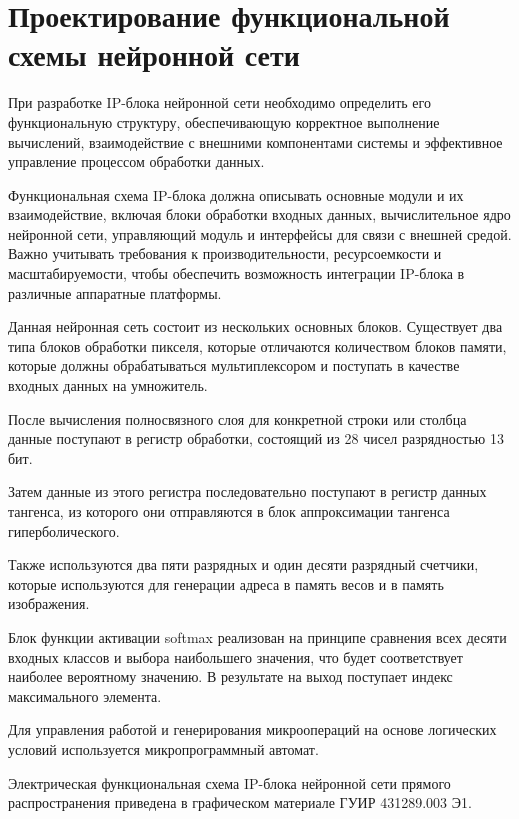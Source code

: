 \section{Проектирование функциональной схемы нейронной сети}
\hspace*{12.5 mm}При разработке IP-блока нейронной сети необходимо определить 
его функциональную структуру, обеспечивающую корректное выполнение вычислений, 
взаимодействие с внешними компонентами системы и эффективное управление 
процессом обработки данных.

Функциональная схема IP-блока должна описывать основные модули и их 
взаимодействие, включая блоки обработки входных данных, вычислительное ядро 
нейронной сети, управляющий модуль и интерфейсы для связи с внешней средой. 
Важно учитывать требования к производительности, ресурсоемкости и 
масштабируемости, чтобы обеспечить возможность интеграции IP-блока в различные 
аппаратные платформы.

Данная нейронная сеть состоит из нескольких основных блоков. Существует два 
типа блоков обработки пикселя, которые отличаются количеством блоков памяти,
которые должны обрабатываться мультиплексором и поступать в качестве входных 
данных на умножитель.

После вычисления полносвязного слоя для конкретной строки или столбца данные 
поступают в регистр обработки, состоящий из 28 чисел разрядностью 13 бит. 

Затем данные из этого регистра последовательно поступают в регистр данных 
тангенса, из которого они отправляются в блок аппроксимации тангенса 
гиперболического.

Также используются два пяти разрядных и один десяти разрядный счетчики, которые
используются для генерации адреса в память весов и в память изображения.

Блок функции активации softmax реализован на принципе сравнения всех десяти 
входных классов и выбора наибольшего значения, что будет соответствует наиболее
вероятному значению. В результате на выход поступает индекс максимального 
элемента.

Для управления работой и генерирования микроопераций на основе логических 
условий используется микропрограммный автомат.

Электрическая функциональная схема IP-блока нейронной сети прямого 
распространения приведена в графическом материале ГУИР 431289.003 Э1. 

